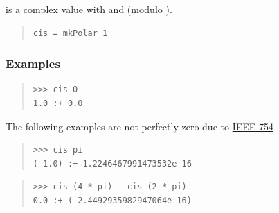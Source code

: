\begin{haddockdesc}
\item[\begin{tabular}{@{}l}
cis :: Floating a => a -> Complex a
\end{tabular}]
{\haddockbegindoc
{} is a complex value with  
 and   (modulo ).\par
\begin{quote}
{\haddockverb\begin{verbatim}
cis = mkPolar 1
\end{verbatim}}
\end{quote}
\subsubsection*{\textbf{Examples}}
\begin{quote}
{\haddockverb\begin{verbatim}
>>> cis 0
1.0 :+ 0.0

\end{verbatim}}
\end{quote}
The following examples are not perfectly zero due to \href{https://en.wikipedia.org/wiki/IEEE_754}{IEEE 754}\par
\begin{quote}
{\haddockverb\begin{verbatim}
>>> cis pi
(-1.0) :+ 1.2246467991473532e-16

\end{verbatim}}
\end{quote}
\begin{quote}
{\haddockverb\begin{verbatim}
>>> cis (4 * pi) - cis (2 * pi)
0.0 :+ (-2.4492935982947064e-16)

\end{verbatim}}
\end{quote}}
\end{haddockdesc}
